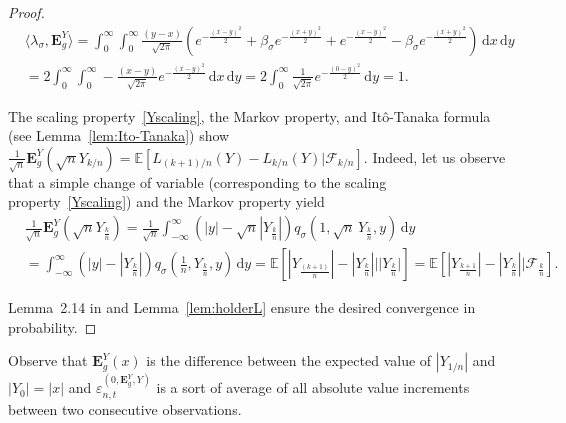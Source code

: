 \documentclass[12pt]{article}
\numberwithin{equation}{section}
\theoremstyle{definition}
\theoremstyle{remark}
\newcommand{\EE}{\mathbb{E}}
\newcommand{\cF}{\mathcal{F}}
\newcommand{\vd}{\,\mathrm{d}}
\newcommand{\bfH}[1]{\mathbf{E}^Y_{#1}}
\begin{document}
\begin{proof}
\begin{equation} \begin{split}
	& \langle \lambda_\sigma , \bfH{g} \rangle 
	 = 
	\int_{0}^{\infty} \int_{0}^{\infty} \frac{(y-x)}{\sqrt{2 \pi}} 
	\left( e^{- \frac{(x-y)^2}2} 
		+ {\beta_\sigma} e^{- \frac{(x+y)^2}2} 
		+ e^{- \frac{(x-y)^2}2} 
		- {\beta_\sigma} e^{-\frac{(x+y)^2}2}
	\right)\vd x \vd y
	\\
	& = 2 \int_0^\infty   \int_{0}^{\infty} -\frac{(x-y)}{\sqrt{2 \pi}} 
	 e^{- \frac{(x-y)^2}2} \vd x \vd y
	 = 2 \int_0^\infty  \frac1{\sqrt{2 \pi}} 
	 e^{- \frac{(0-y)^2}2}  \vd y =1.
\end{split}\end{equation}
%

The scaling property~\eqref{Yscaling}, the Markov property, and It\^o-Tanaka formula (see Lemma~\ref{lem:Ito-Tanaka}) show 
$\frac1{\sqrt{n}}{\bfH{g}(\sqrt{n}Y_{k/n})} = \EE\!\left[  L_{(k+1)/n}(Y) - L_{k/n}(Y) | \cF_{k/n} \right]\!.$
Indeed, let us observe that a simple change of variable (corresponding to the scaling property~\eqref{Yscaling}) and the Markov property yield
\begin{equation}
\begin{split} 
	& \frac{1}{\sqrt{n}}\bfH{g}(\sqrt{n}Y_{\frac{k}{n}}) 
	= \frac1{\sqrt{n}} \int_{-\infty}^{\infty} \left( |y|- \sqrt{n}|Y_{\frac{k}{n}}| \right) q_\sigma(1,\sqrt{n}\, Y_{\frac{k}{n}}, y) \vd y
	\\
	& = \int_{-\infty}^{\infty} \left( |y|- |Y_{\frac{k}{n}}| \right) q_\sigma(\tfrac1{n},Y_{\frac{k}{n}}, y) \vd y
	= \EE\!\left[ |Y_{\frac{(k+1)}{n}}| - |Y_{\frac{k}{n}}| | |Y_{\frac{k}{n}}| \right] = \EE\!\left[ |Y_{\frac{k+1}{n}}| - |Y_{\frac{k}{n}}| | \cF_{\frac{k}{n}} \right] \!.
\end{split}
\end{equation}

Lemma~2.14 in \cite{j3} and Lemma~\ref{lem:holderL} ensure the desired convergence in probability.
\end{proof}

Observe that $\bfH{g}(x)$ is the difference between the expected value of $|Y_{1/n}|$ and $|Y_0|=|x|$
and $\varepsilon_{n,t}^{(0,\bfH{g},Y)}$ is a sort of average of all absolute value increments between two consecutive observations.


\end{document}
